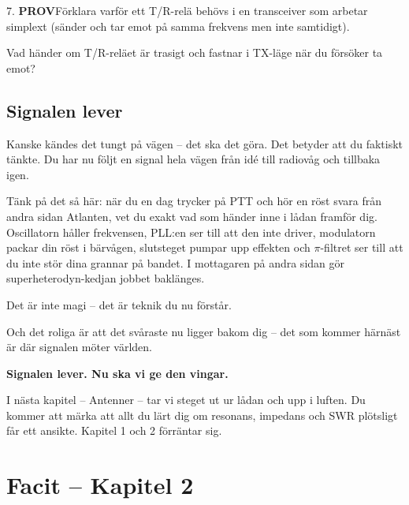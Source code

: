 \documentclass[a4paper,11pt,twoside]{book}
\newcommand{\qprov}{\colorbox{redpale}{\textcolor{reddark}{\headingfont\bfseries\tiny PROV}}}
\begin{document}
\begin{qblock}{7.}
\qprov\quad Förklara varför ett T/R-relä behövs i en transceiver
som arbetar simplext (sänder och tar emot på samma frekvens
men inte samtidigt).

Vad händer om T/R-reläet är trasigt och fastnar i TX-läge
när du försöker ta emot?
\end{qblock}

\section*{Signalen lever}

Kanske kändes det tungt på vägen -- det ska det göra. Det betyder
att du faktiskt tänkte. Du har nu följt en signal hela vägen från
idé till radiovåg och tillbaka igen.

Tänk på det så här: när du en dag trycker på PTT och hör en röst
svara från andra sidan Atlanten, vet du exakt vad som händer inne
i lådan framför dig. Oscillatorn håller frekvensen, PLL:en ser
till att den inte driver, modulatorn packar din röst i bärvågen,
slutsteget pumpar upp effekten och $\pi$-filtret ser till att du
inte stör dina grannar på bandet. I mottagaren på andra sidan
gör superheterodyn-kedjan jobbet baklänges.

Det är inte magi -- det är teknik du nu förstår.

\medskip
\noindent
Och det roliga är att det svåraste nu ligger bakom dig -- det som
kommer härnäst är där signalen möter världen.

\begin{bluebox}[title={}]
\textbf{Signalen lever. Nu ska vi ge den vingar.}

\smallskip
I nästa kapitel -- Antenner -- tar vi steget ut ur lådan och upp
i luften. Du kommer att märka att allt du lärt dig om resonans,
impedans och SWR plötsligt får ett ansikte. Kapitel 1 och 2
förräntar sig.
\end{bluebox}

\chapter*{Facit – Kapitel 2}
\end{document}
